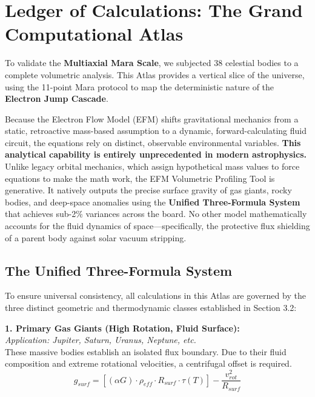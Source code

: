\documentclass[11pt, a4paper]{article}
\begin{document}
\clearpage
\section{Ledger of Calculations: The Grand Computational Atlas}

To validate the \textbf{Multiaxial Mara Scale}, we subjected 38 celestial bodies to a complete volumetric analysis. This Atlas provides a vertical slice of the universe, using the 11-point Mara protocol to map the deterministic nature of the \textbf{Electron Jump Cascade}.

Because the Electron Flow Model (EFM) shifts gravitational mechanics from a static, retroactive mass-based assumption to a dynamic, forward-calculating fluid circuit, the equations rely on distinct, observable environmental variables. \textbf{This analytical capability is entirely unprecedented in modern astrophysics.} Unlike legacy orbital mechanics, which assign hypothetical mass values to force equations to make the math work, the EFM Volumetric Profiling Tool is generative. It natively outputs the precise surface gravity of gas giants, rocky bodies, and deep-space anomalies using the \textbf{Unified Three-Formula System} that achieves sub-2\% variances across the board. No other model mathematically accounts for the fluid dynamics of space---specifically, the protective flux shielding of a parent body against solar vacuum stripping.

\vspace{1.5em}
\subsection{The Unified Three-Formula System}
To ensure universal consistency, all calculations in this Atlas are governed by the three distinct geometric and thermodynamic classes established in Section 3.2:

\vspace{0.5em}
\noindent \textbf{1. Primary Gas Giants (High Rotation, Fluid Surface):} \\
\textit{Application: Jupiter, Saturn, Uranus, Neptune, etc.} \\
These massive bodies establish an isolated flux boundary. Due to their fluid composition and extreme rotational velocities, a centrifugal offset is required.
$$g_{surf} = \left[ (\alpha G) \cdot \rho_{eff} \cdot R_{surf} \cdot \tau(T) \right] - \frac{v_{rot}^2}{R_{surf}}$$
\end{document}
